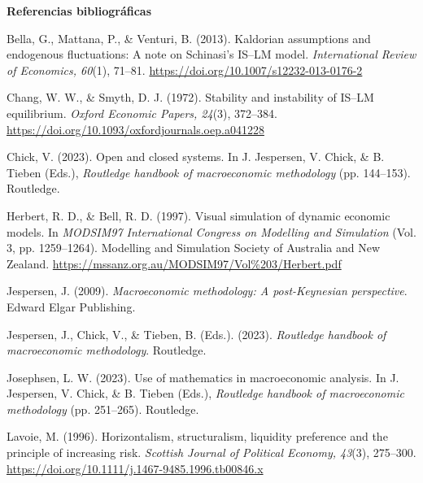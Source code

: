 \documentclass[10.5pt,twoside]{article}
\newcounter{rsec}
\newcommand{\rsection}{%
  \refstepcounter{rsec}%
  \par\vspace{1.35em}%
  \begin{center}\fontsize{14}{16}\selectfont\Roman{rsec}\end{center}%
  \vspace{0.35em}%
}
\begin{document}
\clearpage
\rsection
\noindent\textbf{Referencias bibliográficas}
\par\medskip
\begingroup\sloppy\small
\begin{list}{}{
\setlength{\leftmargin}{1.5em}
\setlength{\itemindent}{-1.5em}
\setlength{\itemsep}{0.55em}
\setlength{\parsep}{0pt}}

\item Bella, G., Mattana, P., \& Venturi, B. (2013). Kaldorian assumptions and endogenous fluctuations: A note on Schinasi's IS--LM model. \textit{International Review of Economics, 60}(1), 71--81. \url{https://doi.org/10.1007/s12232-013-0176-2}

\item Chang, W. W., \& Smyth, D. J. (1972). Stability and instability of IS--LM equilibrium. \textit{Oxford Economic Papers, 24}(3), 372--384. \url{https://doi.org/10.1093/oxfordjournals.oep.a041228}

\item Chick, V. (2023). Open and closed systems. In J. Jespersen, V. Chick, \& B. Tieben (Eds.), \textit{Routledge handbook of macroeconomic methodology} (pp. 144--153). Routledge.


\item Herbert, R. D., \& Bell, R. D. (1997). Visual simulation of dynamic economic models. In \textit{MODSIM97 International Congress on Modelling and Simulation} (Vol. 3, pp. 1259--1264). Modelling and Simulation Society of Australia and New Zealand. \url{https://mssanz.org.au/MODSIM97/Vol%203/Herbert.pdf}

\item Jespersen, J. (2009). \textit{Macroeconomic methodology: A post-Keynesian perspective}. Edward Elgar Publishing.

\item Jespersen, J., Chick, V., \& Tieben, B. (Eds.). (2023). \textit{Routledge handbook of macroeconomic methodology}. Routledge.

\item Josephsen, L. W. (2023). Use of mathematics in macroeconomic analysis. In J. Jespersen, V. Chick, \& B. Tieben (Eds.), \textit{Routledge handbook of macroeconomic methodology} (pp. 251--265). Routledge.

\item Lavoie, M. (1996). Horizontalism, structuralism, liquidity preference and the principle of increasing risk. \textit{Scottish Journal of Political Economy, 43}(3), 275--300. \url{https://doi.org/10.1111/j.1467-9485.1996.tb00846.x}


\end{list}
\end{document}

